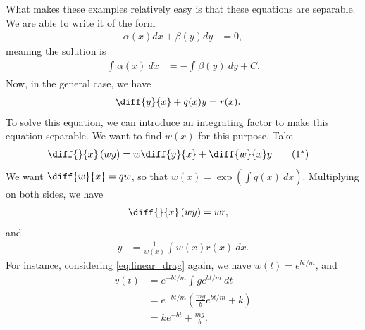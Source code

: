 \documentclass[10pt]{mypackage}
\begin{document}
  What makes these examples relatively easy is that these equations are separable. We are able to write it of the form
  \begin{align*}
    \alpha(x) dx + \beta(y) dy &= 0,
  \end{align*}
  meaning the solution is
  \begin{align*}
    \int_{}^{} \alpha(x)\:dx &= - \int_{}^{} \beta(y)\:dy + C.
  \end{align*}
  Now, in the general case, we have
  \begin{align*}
    \diff{y}{x} + q(x)y &= r(x).
  \end{align*}
  To solve this equation, we can introduce an integrating factor to make this equation separable. We want to find $w(x)$ for this purpose. Take
  \begin{align*}
    \diff{}{x}\left( wy \right) &= w\diff{y}{x} + \diff{w}{x} y\label{eq:integrating_factor}\tag{$1^{\ast}$}
  \end{align*}
  We want $\diff{w}{x} = qw$, so that $w(x) = \exp\left( \int_{}^{} q(x)\:dx \right)$. Multiplying on both sides, we have
  \begin{align*}
    \diff{}{x}\left( wy \right) &= wr,
  \end{align*}
  and
  \begin{align*}
    y &= \frac{1}{w(x)} \int_{}^{} w(x)r(x)\:dx.
  \end{align*}
  For instance, considering \eqref{eq:linear_drag} again, we have $w(t) = e^{bt/m}$, and
  \begin{align*}
    v(t) &= e^{-bt/m} \int_{}^{} ge^{bt/m}\:dt\\
         &= e^{-bt/m} \left( \frac{mg}{b}e^{bt/m} + k \right)\\
         &=ke^{-bt} + \frac{mg}{b}.
  \end{align*}
\end{document}
